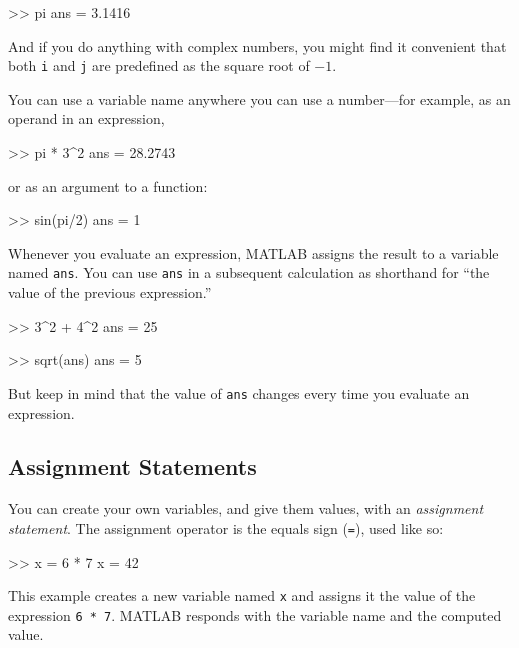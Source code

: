 \documentclass[../../book.tex]{subfiles}
\begin{document}
\begin{code}
>> pi
ans = 3.1416
\end{code}

And if you do anything with complex numbers, you might find it
convenient that both \lstinline{i} and \lstinline{j} are predefined as the square
root of $-1$.


You can use a variable name anywhere you can use a number---for example, as
an operand in an expression,

\begin{code}
>> pi * 3^2
ans = 28.2743
\end{code}
or as an argument to a function:

\begin{code}
>> sin(pi/2)
ans = 1
\end{code}


Whenever you evaluate an expression, MATLAB assigns the result to
a variable named \lstinline{ans}.  You can use \lstinline{ans} in a subsequent
calculation as shorthand for ``the value of the previous expression.''

\begin{code}
>> 3^2 + 4^2
ans = 25

>> sqrt(ans)
ans = 5
\end{code}

But keep in mind that the value of \lstinline{ans} changes every time
you evaluate an expression.


\subsection{Assignment Statements}

You can create your own variables, and give them values, with
an \emph{assignment statement}.  The assignment operator is the
equals sign (\lstinline{=}), used like so:


\begin{code}
>> x = 6 * 7
x = 42
\end{code}

This example creates a new variable named \lstinline{x} and assigns it the
value of the expression \lstinline{6 * 7}.  MATLAB responds with the
variable name and the computed value.
\end{document}
